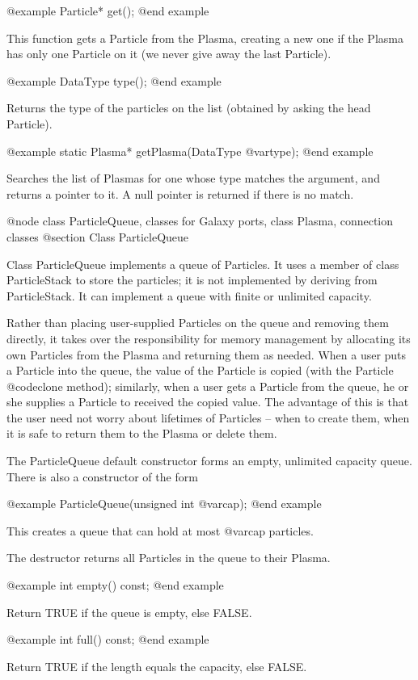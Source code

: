 @example
Particle* get();
@end example

This function gets a Particle from the Plasma, creating a new one if
the Plasma has only one Particle on it (we never give away the last
Particle).

@example
DataType type();
@end example

Returns the type of the particles on the list (obtained by asking the
head Particle).

@example
static Plasma* getPlasma(DataType @var{type});
@end example

Searches the list of Plasmas for one whose type matches the argument,
and returns a pointer to it.  A null pointer is returned if there is
no match.

@node class ParticleQueue, classes for Galaxy ports, class Plasma, connection classes
@section Class ParticleQueue

Class ParticleQueue implements a queue of Particles.  It uses a member
of class ParticleStack to store the particles; it is not implemented
by deriving from ParticleStack.  It can implement a queue with finite
or unlimited capacity.

Rather than placing user-supplied Particles on the queue and removing
them directly, it takes over the responsibility for memory management
by allocating its own Particles from the Plasma and returning them
as needed.  When a user puts a Particle into the queue, the value of
the Particle is copied (with the Particle @code{clone} method);
similarly, when a user gets a Particle from the queue, he or she
supplies a Particle to received the copied value.  The advantage of
this is that the user need not worry about lifetimes of Particles --
when to create them, when it is safe to return them to the Plasma
or delete them.

The ParticleQueue default constructor forms an empty, unlimited capacity
queue.  There is also a constructor of the form

@example
ParticleQueue(unsigned int @var{cap});
@end example

This creates a queue that can hold at most @var{cap} particles.

The destructor returns all Particles in the queue to their Plasma.

@example
int empty() const;
@end example

Return TRUE if the queue is empty, else FALSE.

@example
int full() const;
@end example

Return TRUE if the length equals the capacity, else FALSE.

